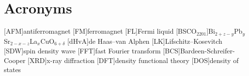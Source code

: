 
\section{Acronyms}

\begin{acronym}
    [AFM]{antiferromagnet}
    [FM]{ferromagnet}
    [FL]{Fermi liquid}
    [BSCO$_{2201}$]{Bi$_{2+z-y}$Pb$_{y}$Sr$_{2-x-z}$La$_{x}$CuO$_{6+\delta}$}
    [dHvA]{de Haas--van Alphen}
    [LK]{Lifschitz--Kosevitch}
    [SDW]{spin density wave}
    [FFT]{fast Fourier transform}
    [BCS]{Bardeen-Schreifer-Cooper}
    [XRD]{x-ray diffraction}
    [DFT]{density functional theory}
    [DOS]{density of states}
\end{acronym}


